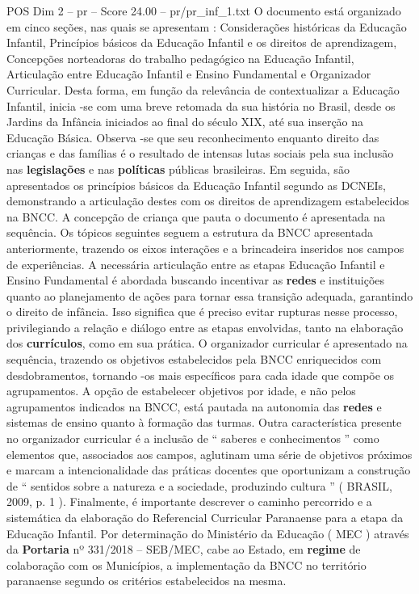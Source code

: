 \begin{textsample}{POS Dim 2 – pr – Score 24.00 – pr/pr\_inf\_1.txt}
O documento está organizado em cinco seções, nas quais se apresentam : Considerações históricas da Educação Infantil, Princípios básicos da Educação Infantil e os direitos de aprendizagem, Concepções norteadoras do trabalho pedagógico na Educação Infantil, Articulação entre Educação Infantil e Ensino Fundamental e Organizador Curricular.
Desta forma, em função da relevância de contextualizar a Educação Infantil, inicia -se com uma breve retomada da sua história no Brasil, desde os Jardins da Infância iniciados ao final do século XIX, até sua inserção na Educação Básica.
Observa -se que seu reconhecimento enquanto direito das crianças e das famílias é o resultado de intensas lutas sociais pela sua inclusão nas \textbf{legislações} e nas \textbf{políticas} públicas brasileiras.
Em seguida, são apresentados os princípios básicos da Educação Infantil segundo as DCNEIs, demonstrando a articulação destes com os direitos de aprendizagem estabelecidos na BNCC.
A concepção de criança que pauta o documento é apresentada na sequência.
Os tópicos seguintes seguem a estrutura da BNCC apresentada anteriormente, trazendo os eixos interações e a brincadeira inseridos nos campos de experiências.
A necessária articulação entre as etapas Educação Infantil e Ensino Fundamental é abordada buscando incentivar as \textbf{redes} e instituições quanto ao planejamento de ações para tornar essa transição adequada, garantindo o direito de infância.
Isso significa que é preciso evitar rupturas nesse processo, privilegiando a relação e diálogo entre as etapas envolvidas, tanto na elaboração dos \textbf{currículos}, como em sua prática.
O organizador curricular é apresentado na sequência, trazendo os objetivos estabelecidos pela BNCC enriquecidos com desdobramentos, tornando -os mais específicos para cada idade que compõe os agrupamentos.
A opção de estabelecer objetivos por idade, e não pelos agrupamentos indicados na BNCC, está pautada na autonomia das \textbf{redes} e sistemas de ensino quanto à formação das turmas.
Outra característica presente no organizador curricular é a inclusão de “ saberes e conhecimentos ” como elementos que, associados aos campos, aglutinam uma série de objetivos próximos e marcam a intencionalidade das práticas docentes que oportunizam a construção de “ sentidos sobre a natureza e a sociedade, produzindo cultura ” ( BRASIL, 2009, p. 1 ).
Finalmente, é importante descrever o caminho percorrido e a sistemática da elaboração do Referencial Curricular Paranaense para a etapa da Educação Infantil.
Por determinação do Ministério da Educação ( MEC ) através da \textbf{Portaria} nº 331/2018 – SEB/MEC, cabe ao Estado, em \textbf{regime} de colaboração com os Municípios, a implementação da BNCC no território paranaense segundo os critérios estabelecidos na mesma.

\end{textsample}

